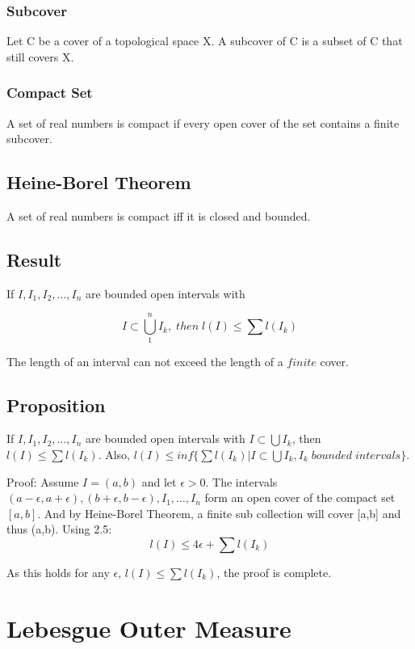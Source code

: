 \documentclass{article}
\begin{document}
 \subsubsection{Subcover}
 
 Let C be a cover of a topological space X. A subcover of C is a subset of C that still covers X.
 
 \subsubsection{Compact Set}
 
A set of real numbers is compact if every open cover of the set contains a finite subcover.

\subsection{Heine-Borel Theorem}
A set of real numbers is compact iff it is closed and bounded.

\subsection{Result}
If $I,I_1,I_2,\dots ,I_n$ are bounded open intervals with 

$$ I \subset \bigcup_{1}^{n}I_k ,\; then  \;l(I) \leq \sum l(I_k)$$

The length of an interval can not exceed the length of a $finite$ cover.

\subsection{Proposition}

If $I,I_1,I_2,\dots ,I_n$ are bounded open intervals with $ I \subset \bigcup I_k$, then $l(I) \leq \sum l(I_k)$. Also, $ l(I) \leq inf\{ \sum l(I_k) | I \subset \bigcup I_k, I_k \; bounded \; intervals \}$.\bigskip

Proof: Assume $I =(a,b)$ and let $\epsilon > 0$. The intervals $(a-\epsilon,a+\epsilon),(b+\epsilon,b-\epsilon),I_1,\dots ,I_n$ form an open cover of the compact set $[a,b]$. And by Heine-Borel Theorem, a finite sub collection will cover [a,b] and thus (a,b).
Using 2.5:
$$  l(I) \leq 4\epsilon +  \sum l(I_k)$$

As this holds for any $\epsilon$, $l(I) \leq \sum l(I_k)$, the proof is complete.
\newpage
\section{Lebesgue Outer Measure}
\end{document}
